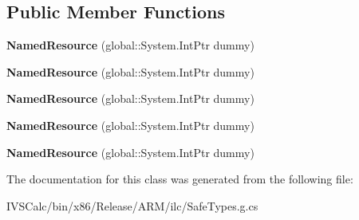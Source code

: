 \subsection*{Public Member Functions}
\begin{DoxyCompactItemize}
\item 
\mbox{\label{class_windows_1_1_application_model_1_1_resources_1_1_core_1_1_named_resource_a8f6bedbe02a5974c8133266c89146bce}} 
{\bfseries Named\+Resource} (global\+::\+System.\+Int\+Ptr dummy)
\item 
\mbox{\label{class_windows_1_1_application_model_1_1_resources_1_1_core_1_1_named_resource_a8f6bedbe02a5974c8133266c89146bce}} 
{\bfseries Named\+Resource} (global\+::\+System.\+Int\+Ptr dummy)
\item 
\mbox{\label{class_windows_1_1_application_model_1_1_resources_1_1_core_1_1_named_resource_a8f6bedbe02a5974c8133266c89146bce}} 
{\bfseries Named\+Resource} (global\+::\+System.\+Int\+Ptr dummy)
\item 
\mbox{\label{class_windows_1_1_application_model_1_1_resources_1_1_core_1_1_named_resource_a8f6bedbe02a5974c8133266c89146bce}} 
{\bfseries Named\+Resource} (global\+::\+System.\+Int\+Ptr dummy)
\item 
\mbox{\label{class_windows_1_1_application_model_1_1_resources_1_1_core_1_1_named_resource_a8f6bedbe02a5974c8133266c89146bce}} 
{\bfseries Named\+Resource} (global\+::\+System.\+Int\+Ptr dummy)
\end{DoxyCompactItemize}


The documentation for this class was generated from the following file\+:\begin{DoxyCompactItemize}
\item 
I\+V\+S\+Calc/bin/x86/\+Release/\+A\+R\+M/ilc/Safe\+Types.\+g.\+cs\end{DoxyCompactItemize}
